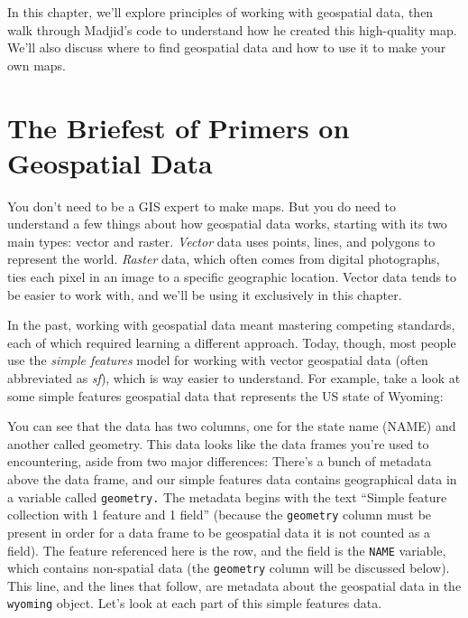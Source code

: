 \documentclass[
]{book}
\begin{document}
In this chapter, we'll explore principles of working with geospatial data, then walk through Madjid's code to understand how he created this high-quality map. We'll also discuss where to find geospatial data and how to use it to make your own maps.

\hypertarget{the-briefest-of-primers-on-geospatial-data}{%
\section*{The Briefest of Primers on Geospatial Data}\label{the-briefest-of-primers-on-geospatial-data}}

You don't need to be a GIS expert to make maps. But you do need to understand a few things about how geospatial data works, starting with its two main types: vector and raster. \emph{Vector} data uses points, lines, and polygons to represent the world. \emph{Raster} data, which often comes from digital photographs, ties each pixel in an image to a specific geographic location. Vector data tends to be easier to work with, and we'll be using it exclusively in this chapter.

In the past, working with geospatial data meant mastering competing standards, each of which required learning a different approach. Today, though, most people use the \emph{simple features} model for working with vector geospatial data (often abbreviated as \emph{sf}), which is way easier to understand. For example, take a look at some simple features geospatial data that represents the US state of Wyoming:

You can see that the data has two columns, one for the state name (NAME) and another called geometry. This data looks like the data frames you're used to encountering, aside from two major differences: There's a bunch of metadata above the data frame, and our simple features data contains geographical data in a variable called \texttt{geometry.} The metadata begins with the text ``Simple feature collection with 1 feature and 1 field'' (because the \texttt{geometry} column must be present in order for a data frame to be geospatial data it is not counted as a field). The feature referenced here is the row, and the field is the \texttt{NAME} variable, which contains non-spatial data (the \texttt{geometry} column will be discussed below). This line, and the lines that follow, are metadata about the geospatial data in the \texttt{wyoming} object. Let's look at each part of this simple features data.
\end{document}
